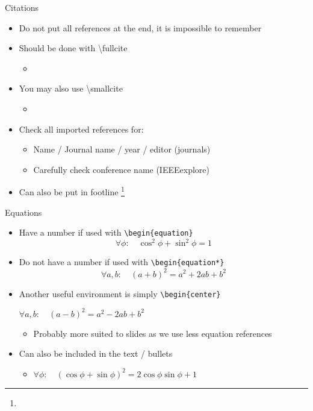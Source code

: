 \documentclass{thesisbeamer}
\begin{document}
\begin{frame}{Citations}
 \begin{itemize}[<+->]
  \item Do not put all references at the end, it is impossible to remember \vfill
  \item Should be done with \textbackslash{fullcite}
  \begin{itemize}[<.->]
   \item {}
  \end{itemize}\vfill
  \item You may also use \textbackslash{smallcite}
  \begin{itemize}[<.->]
   \item {}
  \end{itemize}\vfill
  \item Check all imported references for:
  \begin{itemize}[<.->]
   \item Name / Journal name / year / editor (journals)
   \item Carefully check conference name (IEEEexplore)
  \end{itemize}\vfill
  \item Can also be put in footline \footnote{}
 \end{itemize}
\end{frame}

\begin{frame}{Equations}
\begin{itemize}[<+->]
  \item Have a number if used with \texttt{\textbackslash{begin}\{equation\}}
  \begin{equation}
  \forall \phi: \quad \cos ^2 \phi + \sin^2\phi = 1
  \end{equation}\vfill
  \item Do not have a number if used with \texttt{\textbackslash{begin}\{equation*\}}
    \begin{equation*}
  \forall a, b: \quad (a+b)^2 = a^2 + 2ab + b^2
  \end{equation*}
    \item Another useful environment is simply  \texttt{\textbackslash{begin}\{center\}}
    \begin{center}
    $\forall a, b: \quad (a-b)^2 = a^2 - 2ab + b^2$
    \end{center}
    \begin{itemize}[<+->]
    \item Probably more suited to slides as we use less equation references
  \end{itemize} \vfill\vfill   
  \item Can also be included in the text / bullets
  \begin{itemize}[<+->]
    \item $\forall \phi: \quad  (\cos\phi+\sin\phi)^2 = 2\cos\phi\sin\phi + 1$
  \end{itemize}
\end{itemize}
\end{frame}
\end{document}
